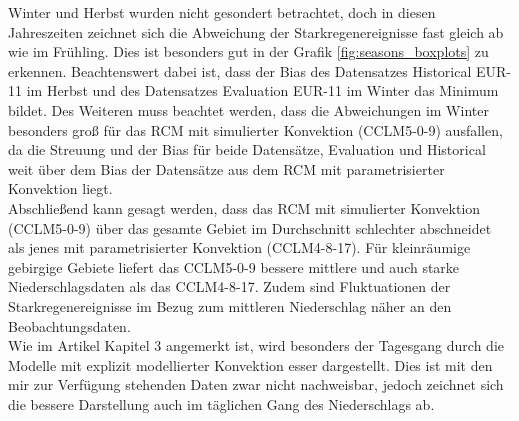 Winter und Herbst wurden nicht gesondert betrachtet, doch in diesen Jahreszeiten zeichnet sich die Abweichung der Starkregenereignisse fast gleich ab wie im Frühling. Dies ist besonders gut in der Grafik \ref{fig:seasons_boxplots} zu erkennen. Beachtenswert dabei ist, dass der Bias des Datensatzes Historical EUR-11 im Herbst und des Datensatzes Evaluation EUR-11 im Winter das Minimum bildet. Des Weiteren muss beachtet werden, dass die Abweichungen im Winter besonders groß für das RCM mit simulierter Konvektion (CCLM5-0-9) ausfallen, da die Streuung und der Bias für beide Datensätze, Evaluation und Historical weit über dem Bias der Datensätze aus dem RCM mit parametrisierter Konvektion liegt.\\
\vspace{1pt}
Abschließend kann gesagt werden, dass das RCM mit simulierter Konvektion (CCLM5-0-9) über das gesamte Gebiet im Durchschnitt schlechter abschneidet als jenes mit parametrisierter Konvektion (CCLM4-8-17). Für kleinräumige gebirgige Gebiete liefert das CCLM5-0-9 bessere mittlere und auch starke Niederschlagsdaten als das CCLM4-8-17. Zudem sind Fluktuationen der Starkregenereignisse im Bezug zum mittleren Niederschlag näher an den Beobachtungsdaten.\\
Wie im Artikel \cite{RCM} Kapitel 3 angemerkt ist, wird besonders der Tagesgang durch die Modelle mit explizit modellierter Konvektion esser dargestellt. Dies ist mit den mir zur Verfügung stehenden Daten zwar nicht nachweisbar, jedoch zeichnet sich die bessere Darstellung auch im täglichen Gang des Niederschlags ab.\\